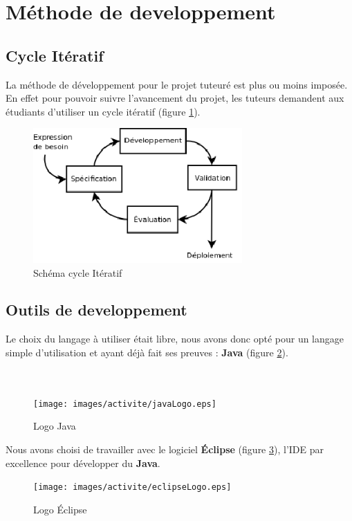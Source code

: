 \section{Méthode de developpement}


\subsection{Cycle Itératif}
La méthode de développement pour le projet tuteuré est plus ou moins imposée. En effet pour pouvoir suivre l'avancement du projet, les tuteurs demandent aux étudiants d'utiliser un cycle itératif (figure \ref{cycle_iteratif}).

\begin{figure}[H]
\centering
\includegraphics[width=8cm]{images/activite/cycle_iteratif.eps}
\caption{Schéma cycle Itératif}
\label{cycle_iteratif}
\end{figure}

\subsection{Outils de developpement}
Le choix du langage à utiliser était libre, nous avons donc opté pour un langage simple d'utilisation et ayant déjà fait ses preuves : \textbf{Java} (figure \ref{java_logo}).
\\
\\
\\

\begin{figure}[!h]
\centering
\texttt{[image: images/activite/javaLogo.eps]}
\caption{Logo Java}
\label{java_logo}
\end{figure}


Nous avons choisi de travailler avec le logiciel \textbf{Éclipse} (figure \ref{eclipse_logo}), l'\gls{IDE} par excellence pour développer du \textbf{Java}.

\begin{figure}[H]
\centering
\texttt{[image: images/activite/eclipseLogo.eps]}
\caption{Logo Éclipse}
\label{eclipse_logo}
\end{figure}

